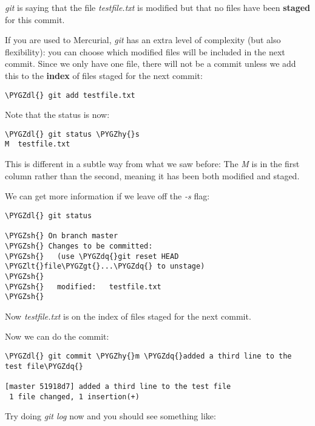 \documentclass[letterpaper,10pt,english]{sphinxmanual}
\def\PYGZlt{\char`\<}
\def\PYGZgt{\char`\>}
\def\PYGZsh{\char`\#}
\def\PYGZdl{\char`\$}
\def\PYGZhy{\char`\-}
\def\PYGZdq{\char`\"}
\begin{document}
\begin{enumerate}
\emph{git} is saying that the file \emph{testfile.txt} is modified but that no
files have been \textbf{staged} for this commit.

If you are used to Mercurial, \emph{git} has an extra level of complexity (but
also flexibility):  you can choose which modified files will be included
in the next commit.  Since we only have one file, there will not be a
commit unless we add this to the \textbf{index} of files staged for the next
commit:

\begin{Verbatim}[commandchars=\\\{\}]
\PYGZdl{} git add testfile.txt
\end{Verbatim}

Note that the status is now:

\begin{Verbatim}[commandchars=\\\{\}]
\PYGZdl{} git status \PYGZhy{}s
M  testfile.txt
\end{Verbatim}

This is different in a subtle way from what we saw before: The \emph{M} is
in the first column rather than the second, meaning it has been both
modified and staged.

We can get more information if we leave off the \emph{-s} flag:

\begin{Verbatim}[commandchars=\\\{\}]
\PYGZdl{} git status

\PYGZsh{} On branch master
\PYGZsh{} Changes to be committed:
\PYGZsh{}   (use \PYGZdq{}git reset HEAD \PYGZlt{}file\PYGZgt{}...\PYGZdq{} to unstage)
\PYGZsh{}
\PYGZsh{}   modified:   testfile.txt
\PYGZsh{}
\end{Verbatim}

Now \emph{testfile.txt} is on the index of files staged for the next commit.

Now we can do the commit:

\begin{Verbatim}[commandchars=\\\{\}]
\PYGZdl{} git commit \PYGZhy{}m \PYGZdq{}added a third line to the test file\PYGZdq{}

[master 51918d7] added a third line to the test file
 1 file changed, 1 insertion(+)
\end{Verbatim}

Try doing \emph{git log} now and you should see something like:


\end{enumerate}
\end{document}
